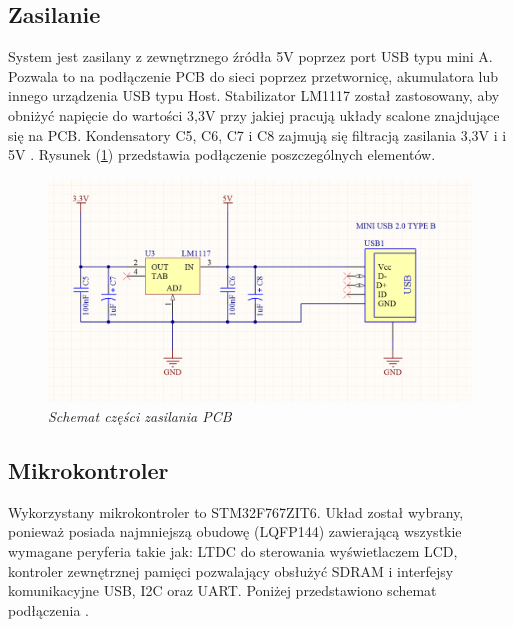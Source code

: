 \documentclass[eng,printmode]{mgr}
\begin{document}
\subsection*{Zasilanie}
System jest zasilany z zewnętrznego źródła 5V poprzez port USB typu mini A. Pozwala to na podłączenie PCB do sieci poprzez przetwornicę, akumulatora lub innego urządzenia USB typu Host.  
Stabilizator LM1117 został zastosowany, aby obniżyć napięcie do wartości 3,3V przy jakiej pracują układy scalone znajdujące się na PCB. Kondensatory C5, C6, C7 i C8 zajmują się filtracją zasilania 3,3V i i 5V \cite{regulator}. Rysunek (\ref{fig:pwerPcb}) przedstawia podłączenie poszczególnych elementów.
\vskip 0.5cm
\begin{figure}[!h]
    \centering
    \includegraphics[width=\textwidth]{schematics/power.png}
    \caption{\textit{Schemat części zasilania PCB}}
    \label{fig:pwerPcb}
\end{figure}
\subsection*{Mikrokontroler}
Wykorzystany mikrokontroler to STM32F767ZIT6. Układ został wybrany, ponieważ posiada najmniejszą obudowę (LQFP144) zawierającą wszystkie wymagane peryferia takie jak: LTDC do sterowania wyświetlaczem LCD, kontroler zewnętrznej pamięci pozwalający obsłużyć SDRAM i interfejsy komunikacyjne USB, I2C oraz UART. Poniżej przedstawiono schemat podłączenia  \cite{stmsheet}.
\end{document}
